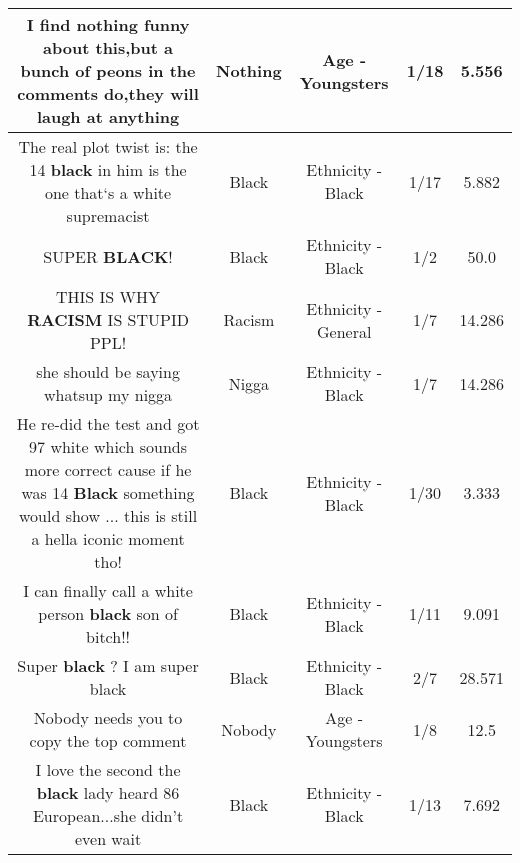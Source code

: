 \documentclass[11pt]{article}
\newlength\mylength
\begin{document}
\begin{center}
\begin{longtable}{|C{.65\mylength}|C{.30\mylength}|C{.12\mylength}|C{.12\mylength}|C{.12\mylength}|}
  \small I find \textbf{nothing} funny about this,but a bunch of peons in the comments do,they will laugh at anything\normalsize   & Nothing & Age - Youngsters & 1/18 & 5.556 \\  \hline
  \small The real plot twist is: the 14 \textbf{black} in him is the one that`s a white supremacist\normalsize   & Black & Ethnicity - Black & 1/17 & 5.882 \\  \hline
  \small SUPER \textbf{BLACK}!\normalsize   & Black & Ethnicity - Black & 1/2 & 50.0 \\  \hline
  \small THIS IS WHY \textbf{RACISM} IS STUPID PPL!\normalsize   & Racism & Ethnicity - General & 1/7 & 14.286 \\  \hline
  \small she should be saying whatsup my nigga\normalsize   & Nigga & Ethnicity - Black & 1/7 & 14.286 \\  \hline
  \small He re-did the test and got 97 white which sounds more correct cause if he was 14 \textbf{Black} something would show ... this is still a hella iconic moment tho!\normalsize   & Black & Ethnicity - Black & 1/30 & 3.333 \\  \hline
  \small I can finally call a white person \textbf{black} son of bitch!!\normalsize   & Black & Ethnicity - Black & 1/11 & 9.091 \\  \hline
  \small Super \textbf{black} ?   I am super black\normalsize   & Black & Ethnicity - Black & 2/7 & 28.571 \\  \hline
  \small Nobody needs you to copy the top comment\normalsize   & Nobody & Age - Youngsters & 1/8 & 12.5 \\  \hline
  \small I love the second the \textbf{black} lady heard 86 European...she didn't even wait\normalsize   & Black & Ethnicity - Black & 1/13 & 7.692 \\  \hline

\end{longtable}
\end{center}
\end{document}
